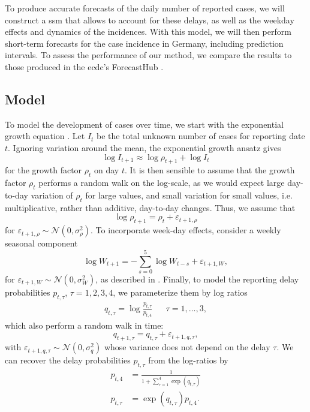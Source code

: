 To produce accurate forecasts of the daily number of reported cases, we will construct a \acrshort{ssm} that allows to account for these delays, as well as the weekday effects and dynamics of the incidences. With this model, we will then perform short-term forecasts for the case incidence in Germany, including prediction intervals. To assess the performance of our method, we compare the results to those produced in the \acrfull{ecdc}'s ForecastHub \citep{Sherratt2022Predictive}.

\subsection{Model}

To model the development of cases over time, we start with the exponential growth equation . Let $I_{t}$ be the total unknown number of cases for reporting date $t$. Ignoring variation around the mean, the exponential growth ansatz gives 
$$
    \log I_{t + 1} \approx \log \rho_{t + 1}  + \log I_{t}
$$
for the growth factor $\rho_{t}$ on day $t$. It is then sensible to assume that the growth factor $\rho_{t}$ performs a random walk on the log-scale, as we would expect large day-to-day variation of $\rho_{t}$ for large values, and small variation for small values, i.e. multiplicative, rather than additive, day-to-day changes. Thus, we assume that 
$$
    \log \rho_{t + 1} = \rho_{t} + \varepsilon_{t + 1, \rho}
$$
for $\varepsilon_{t + 1,\rho} \sim \mathcal N(0, \sigma^{2}_\rho)$. To incorporate week-day effects, consider a weekly seasonal component 
$$
    \log W_{t + 1} = - \sum_{s = 0}^{5} \log W_{t - s} + \varepsilon_{t + 1, W},
$$
for $\varepsilon_{t + 1, W} \sim \mathcal N(0, \sigma^{2}_{W})$, as described in . Finally, to model the reporting delay probabilities $p_{t,\tau}$, $\tau = 1,2,3,4$, we parameterize them by log ratios
\begin{align*}
    q_{t, \tau} = \log \frac{p_{t,\tau}}{p_{t,4}} && \tau = 1,\dots, 3,
\end{align*}
which also perform a random walk in time: 
$$
    q_{t + 1, \tau} = q_{t, \tau} + \varepsilon_{t+1, q, \tau},
$$
with $\varepsilon_{t + 1, q, \tau} \sim \mathcal N(0, \sigma^{2}_{q})$ whose variance does not depend on the delay $\tau$. We can recover the delay probabilities $p_{t, \tau}$ from the log-ratios by 
\begin{align*}
    p_{t, 4} &= \frac{1}{1 + \sum_{\tau = 1}^4 \exp \left( q_{t,\tau} \right)} \\
    p_{t, \tau} &= \exp\left( q_{t, \tau} \right) p_{t, 4}.
\end{align*}

